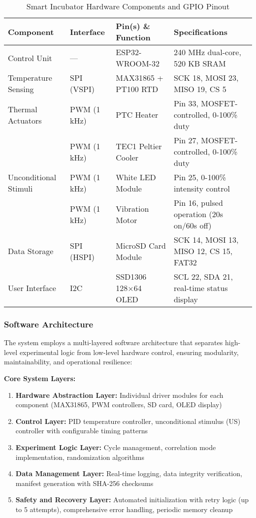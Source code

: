 \documentclass[11pt,a4paper]{article}
\begin{document}
\begin{table}[H]
\centering
\caption{Smart Incubator Hardware Components and GPIO Pinout}
\begin{tabularx}{\textwidth}{|l|l|X|l|}
\hline
\textbf{Component} & \textbf{Interface} & \textbf{Pin(s) \& Function} & \textbf{Specifications} \\
\hline
Control Unit & --- & ESP32-WROOM-32 & 240 MHz dual-core, 520 KB SRAM \\
\hline
Temperature Sensing & SPI (VSPI) & MAX31865 + PT100 RTD & SCK 18, MOSI 23, MISO 19, CS 5 \\
\hline
Thermal Actuators & PWM (1 kHz) & PTC Heater & Pin 33, MOSFET-controlled, 0-100\% duty \\
\hline
 & PWM (1 kHz) & TEC1 Peltier Cooler & Pin 27, MOSFET-controlled, 0-100\% duty \\
\hline
Unconditional Stimuli & PWM (1 kHz) & White LED Module & Pin 25, 0-100\% intensity control \\
\hline
 & PWM (1 kHz) & Vibration Motor & Pin 16, pulsed operation (20s on/60s off) \\
\hline
Data Storage & SPI (HSPI) & MicroSD Card Module & SCK 14, MOSI 13, MISO 12, CS 15, FAT32 \\
\hline
User Interface & I2C & SSD1306 128×64 OLED & SCL 22, SDA 21, real-time status display \\
\hline
\end{tabularx}
\end{table}

\subsubsection{Software Architecture}

The system employs a multi-layered software architecture that separates high-level experimental logic from low-level hardware control, ensuring modularity, maintainability, and operational resilience:

\textbf{Core System Layers:}
\begin{enumerate}
\item \textbf{Hardware Abstraction Layer:} Individual driver modules for each component (MAX31865, PWM controllers, SD card, OLED display)
\item \textbf{Control Layer:} PID temperature controller, unconditional stimulus (US) controller with configurable timing patterns
\item \textbf{Experiment Logic Layer:} Cycle management, correlation mode implementation, randomization algorithms
\item \textbf{Data Management Layer:} Real-time logging, data integrity verification, manifest generation with SHA-256 checksums
\item \textbf{Safety and Recovery Layer:} Automated initialization with retry logic (up to 5 attempts), comprehensive error handling, periodic memory cleanup
\end{enumerate}
\end{document}
